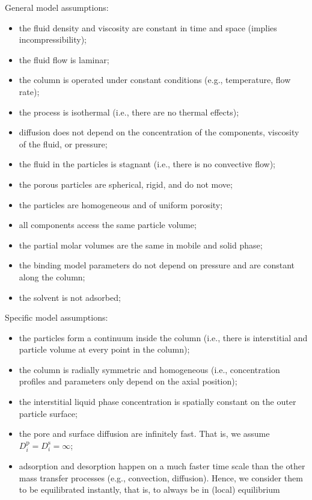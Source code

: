\documentclass{article}
\begin{document}
General model assumptions:
\begin{itemize}
\item the fluid density and viscosity are constant in time and space (implies incompressibility);
\item the fluid flow is laminar;
\item the column is operated under constant conditions (e.g., temperature, flow rate);
\item the process is isothermal (i.e., there are no thermal effects);
\item diffusion does not depend on the concentration of the components, viscosity of the fluid, or pressure;
\item the fluid in the particles is stagnant (i.e., there is no convective flow);
\item the porous particles are spherical, rigid, and do not move;
\item the particles are homogeneous and of uniform porosity;
\item all components access the same particle volume;
\item the partial molar volumes are the same in mobile and solid phase;
\item the binding model parameters do not depend on pressure and are constant along the column;
\item the solvent is not adsorbed;
\end{itemize}


Specific model assumptions:
\begin{itemize}
\item the particles form a continuum inside the column (i.e., there is interstitial and particle volume at every point in the column);
\item the column is radially symmetric and homogeneous (i.e., concentration profiles and parameters only depend on the axial position);
\item the interstitial liquid phase concentration is spatially constant on the outer particle surface;
\item the pore and surface diffusion are infinitely fast. That is, we assume $D_{i}^{\mathrm{p}} = D_{i}^{\mathrm{s}} = \infty$;
\item adsorption and desorption happen on a much faster time scale than the other mass transfer processes (e.g., convection, diffusion). Hence, we consider them to be equilibrated instantly, that is, to always be in (local) equilibrium
\end{itemize}
\end{document}
